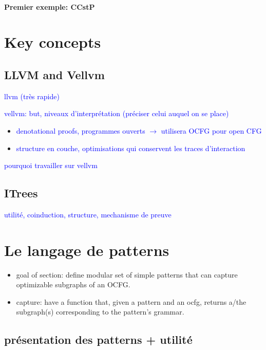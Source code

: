 \documentclass[11pt]{article}
\newcommand{\leon}[1]{\textcolor{blue}{#1}}
\begin{document}
\paragraph{Premier exemple: CCstP}

\section{Key concepts}
\label{sec:concepts}

\subsection{LLVM and Vellvm}

\leon{llvm (très rapide)}

\leon{vellvm: but, niveaux d'interprétation (préciser celui auquel on se place)}

\begin{itemize}
  \item \leon{denotational proofs, programmes ouverts $\rightarrow$ utilisera OCFG pour open CFG}
  \item \leon{structure en couche, optimisations qui conservent les traces d'interaction}
\end{itemize}

\leon{pourquoi travailler sur vellvm}

\subsection{ITrees}

\leon{utilité, coinduction, structure, mechanisme de preuve}

\section{Le langage de patterns}
\label{sec:lang}

\begin{itemize}
  \item goal of section: define modular set of simple patterns that can capture optimizable subgraphs of an OCFG.
  \item capture: have a function that, given a pattern and an ocfg, returns a/the subgraph(s) corresponding to the pattern's grammar.
\end{itemize}

\subsection{présentation des patterns + utilité}
\end{document}
